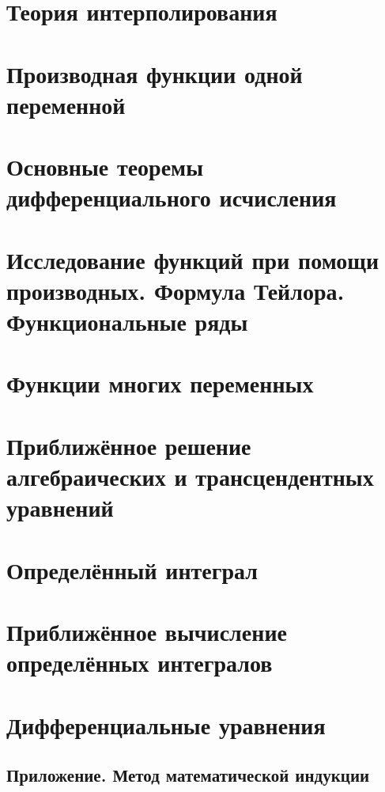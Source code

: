 \chapter{Теория интерполирования}
\chapter{Производная функции одной переменной}
\chapter[Дифференциальное исчисление]{Основные теоремы дифференциального
	исчисления}
\chapter[Исследование функции]{Исследование функций при помощи производных.
	Формула Тейлора. Функциональные ряды}
\chapter{Функции многих переменных}
\chapter[Приближённое рещение уравнений]{Приближённое решение алгебраических и
	трансцендентных уравнений}
\chapter{Определённый интеграл}
\chapter[Вычисление интегралов]{Приближённое вычисление определённых
	интегралов}
\chapter{Дифференциальные уравнения}
\section{Приложение. Метод математической индукции}

